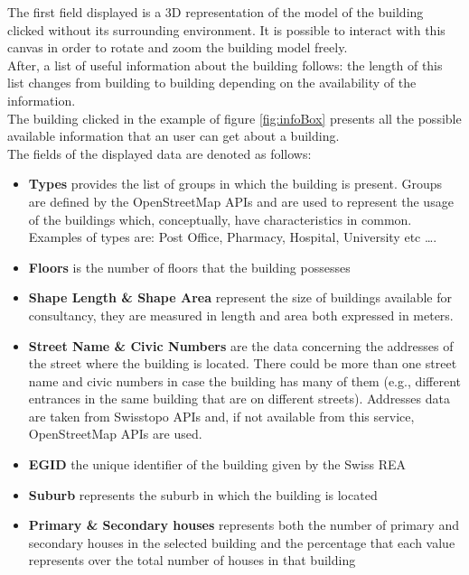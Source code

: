 The first field displayed is a 3D representation of the model of the building clicked without its surrounding environment. It is possible to interact with this canvas in order to rotate and zoom the building model freely.\\
After, a list of useful information about the building follows: the length of this list changes from building to building depending on the availability of the information.\\
The building clicked in the example of figure \ref{fig:infoBox} presents all the possible available information that an user can get about a building.\\
The fields of the displayed data are denoted as follows: 
\begin{itemize}
\item {\bf Types} provides the list of groups in which the building is present. Groups are defined by the OpenStreetMap APIs and are used to represent the usage of the buildings which, conceptually, have characteristics in common. Examples of types are: Post Office, Pharmacy, Hospital, University etc \dots.
\item {\bf Floors} is the number of floors that the building possesses
\item {\bf Shape Length \& Shape Area} represent the size of buildings available for consultancy, they are measured in length and area both expressed in meters.
\item {\bf Street Name \& Civic Numbers} are the data concerning the addresses of the street where the building is located. There could be more than one street name and civic numbers in case the building has many of them (e.g., different entrances in the same building that are on different streets). Addresses data are taken from Swisstopo APIs and, if not available from this service, OpenStreetMap APIs are used.
\item {\bf EGID} the unique identifier of the building given by the Swiss REA 
\item {\bf Suburb} represents the suburb in which the building is located
\item {\bf Primary \& Secondary houses} represents both the number of primary and secondary houses in the selected building and the percentage that each value represents over the total number of houses in that building
\end{itemize}

